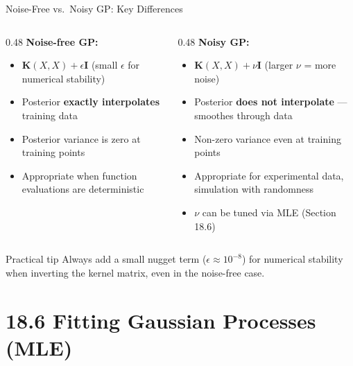 \documentclass[aspectratio=169,10pt]{beamer}
\begin{document}
\begin{frame}{Noise-Free vs.\ Noisy GP: Key Differences}
  \begin{columns}[T]
    \begin{column}{0.48\textwidth}
      \textbf{Noise-free GP:}
      \begin{itemize}
        \item $\mathbf{K}(X,X) + \epsilon\mathbf{I}$ (small $\epsilon$ for numerical stability)
        \item Posterior \textbf{exactly interpolates} training data
        \item Posterior variance is zero at training points
        \item Appropriate when function evaluations are deterministic
      \end{itemize}
    \end{column}
    \begin{column}{0.48\textwidth}
      \textbf{Noisy GP:}
      \begin{itemize}
        \item $\mathbf{K}(X,X) + \nu\mathbf{I}$ (larger $\nu$ = more noise)
        \item Posterior \textbf{does not interpolate} --- smoothes through data
        \item Non-zero variance even at training points
        \item Appropriate for experimental data, simulation with randomness
        \item $\nu$ can be tuned via MLE (Section 18.6)
      \end{itemize}
    \end{column}
  \end{columns}
  \vspace{0.4em}
  \begin{alertblock}{Practical tip}
    Always add a small nugget term ($\epsilon \approx 10^{-8}$) for numerical
    stability when inverting the kernel matrix, even in the noise-free case.
  \end{alertblock}
\end{frame}

\section{18.6 Fitting Gaussian Processes (MLE)}
\end{document}
